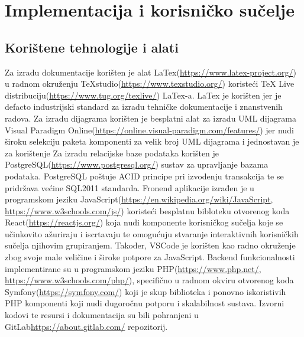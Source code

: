 \chapter{Implementacija i korisničko sučelje}
		
		
		\section{Korištene tehnologije i alati}
		
			
			
			Za izradu dokumentacije korišten je alat LaTex(\url{https://www.latex-project.org/}) u radnom okruženju TeXstudio(\url{https://www.texstudio.org/}) koristeći TeX Live distribuciju(\url{https://www.tug.org/texlive/}) LaTex-a. LaTex je korišten jer je defacto industrijski standard za izradu tehničke dokumentacije i znanstvenih radova.
			Za izradu dijagrama korišten je besplatni alat za izradu UML dijagrama Visual Paradigm Online(\url{https://online.visual-paradigm.com/features/}) jer nudi široku selekciju paketa komponenti za velik broj UML dijagrama i jednostavan je za korištenje
			Za izradu relacijske baze podataka korišten je PostgreSQL(\url{https://www.postgresql.org/}) sustav za upravljanje bazama podataka. PostgreSQL poštuje ACID principe pri izvođenju transakcija te se pridržava većine SQL2011 standarda.
			Fronend aplikacije izrađen je u programskom jeziku JavaScript(\url{https://en.wikipedia.org/wiki/JavaScript}, \url{https://www.w3schools.com/js/}) koristeći besplatnu bibloteku otvorenog koda React(\url{https://reactjs.org/}) koja nudi komponente korisničkog sučelja koje se učinkovito ažuriraju i iscrtavaju te omogućuju stvaranje interaktivnih korisničkih sučelja njihovim grupiranjem. Također, VSCode je korišten kao radno okruženje zbog svoje male veličine i široke potpore za JavaScript. 
			Backend funkcionalnosti implementirane su u programskom jeziku PHP(\url{https://www.php.net/}, \url{https://www.w3schools.com/php/}), specifično u radnom okviru otvorenog koda Symfony(\url{https://symfony.com/}) koji je skup biblioteka i ponovno iskoristivih PHP komponenti koji nudi dugoročnu potporu i skalabilnost sustava.
			Izvorni kodovi te resursi i dokumentacija su bili pohranjeni u GitLab{\url{https://about.gitlab.com/}} repozitorij.	
		

